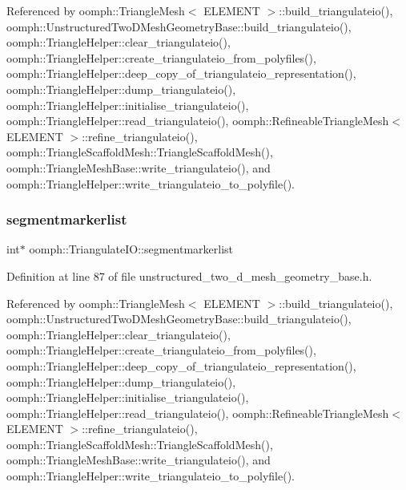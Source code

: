 Referenced by oomph\+::\+Triangle\+Mesh$<$ E\+L\+E\+M\+E\+N\+T $>$\+::build\+\_\+triangulateio(), oomph\+::\+Unstructured\+Two\+D\+Mesh\+Geometry\+Base\+::build\+\_\+triangulateio(), oomph\+::\+Triangle\+Helper\+::clear\+\_\+triangulateio(), oomph\+::\+Triangle\+Helper\+::create\+\_\+triangulateio\+\_\+from\+\_\+polyfiles(), oomph\+::\+Triangle\+Helper\+::deep\+\_\+copy\+\_\+of\+\_\+triangulateio\+\_\+representation(), oomph\+::\+Triangle\+Helper\+::dump\+\_\+triangulateio(), oomph\+::\+Triangle\+Helper\+::initialise\+\_\+triangulateio(), oomph\+::\+Triangle\+Helper\+::read\+\_\+triangulateio(), oomph\+::\+Refineable\+Triangle\+Mesh$<$ E\+L\+E\+M\+E\+N\+T $>$\+::refine\+\_\+triangulateio(), oomph\+::\+Triangle\+Scaffold\+Mesh\+::\+Triangle\+Scaffold\+Mesh(), oomph\+::\+Triangle\+Mesh\+Base\+::write\+\_\+triangulateio(), and oomph\+::\+Triangle\+Helper\+::write\+\_\+triangulateio\+\_\+to\+\_\+polyfile().

\mbox{\label{structoomph_1_1TriangulateIO_a575c4af48f801838fbed1cac09d9f744}} 
\subsubsection{\texorpdfstring{segmentmarkerlist}{segmentmarkerlist}}
{\footnotesize\ttfamily int$\ast$ oomph\+::\+Triangulate\+I\+O\+::segmentmarkerlist}



Definition at line 87 of file unstructured\+\_\+two\+\_\+d\+\_\+mesh\+\_\+geometry\+\_\+base.\+h.



Referenced by oomph\+::\+Triangle\+Mesh$<$ E\+L\+E\+M\+E\+N\+T $>$\+::build\+\_\+triangulateio(), oomph\+::\+Unstructured\+Two\+D\+Mesh\+Geometry\+Base\+::build\+\_\+triangulateio(), oomph\+::\+Triangle\+Helper\+::clear\+\_\+triangulateio(), oomph\+::\+Triangle\+Helper\+::create\+\_\+triangulateio\+\_\+from\+\_\+polyfiles(), oomph\+::\+Triangle\+Helper\+::deep\+\_\+copy\+\_\+of\+\_\+triangulateio\+\_\+representation(), oomph\+::\+Triangle\+Helper\+::dump\+\_\+triangulateio(), oomph\+::\+Triangle\+Helper\+::initialise\+\_\+triangulateio(), oomph\+::\+Triangle\+Helper\+::read\+\_\+triangulateio(), oomph\+::\+Refineable\+Triangle\+Mesh$<$ E\+L\+E\+M\+E\+N\+T $>$\+::refine\+\_\+triangulateio(), oomph\+::\+Triangle\+Scaffold\+Mesh\+::\+Triangle\+Scaffold\+Mesh(), oomph\+::\+Triangle\+Mesh\+Base\+::write\+\_\+triangulateio(), and oomph\+::\+Triangle\+Helper\+::write\+\_\+triangulateio\+\_\+to\+\_\+polyfile().

